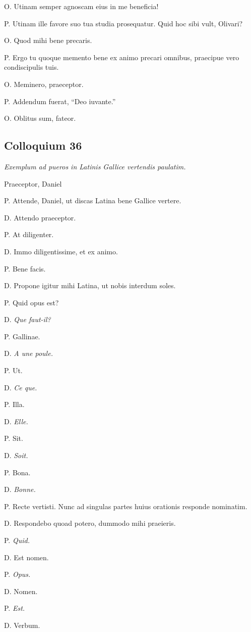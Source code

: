 \documentclass{article}
\begin{document}
O. Utinam semper agnoscam eius in me beneficia!

P. Utinam ille favore suo tua studia prosequatur. Quid hoc sibi vult, Olivari?

O. Quod mihi bene precaris.

P. Ergo tu quoque memento bene ex animo precari omnibus, praecipue vero condiscipulis tuis.

O. Meminero, praeceptor.

P. Addendum fuerat, ``Deo iuvante.''

O. Oblitus sum, fateor.

\subsection{Colloquium 36}
\emph{Exemplum ad pueros in Latinis Gallice vertendis paulatim.}

Praeceptor, Daniel

P. Attende, Daniel, ut discas Latina bene Gallice vertere.

D. Attendo praeceptor.

P. At diligenter.

D. Immo diligentissime, et ex animo.

P. Bene facis.

D. Propone igitur mihi Latina, ut nobis interdum soles.

P. Quid opus est?

D. \emph{Que faut-il?}

P. Gallinae.

D. \emph{A une poule.}

P. Ut.

D. \emph{Ce que.}

P. Illa.

D. \emph{Elle.}

P. Sit.

D. \emph{Soit.}

P. Bona.

D. \emph{Bonne.}

P. Recte vertisti. Nunc ad singulas partes huius orationis responde nominatim.

D.  Respondebo quoad potero, dummodo mihi praeieris.

P. \emph{Quid.}

D. Est nomen.

P. \emph{Opus.}

D. Nomen.

P. \emph{Est.}

D. Verbum.
\end{document}
